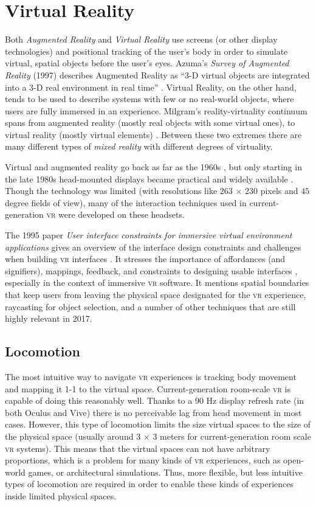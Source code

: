\documentclass{tufte-book} %
\begin{document}
\section{Virtual Reality}
Both \emph{Augmented Reality} and \emph{Virtual Reality} use screens (or other display technologies) and positional tracking of the user's body in order to simulate virtual, spatial objects before the user's eyes. Azuma's \emph{Survey of Augmented Reality} (1997) describes Augmented Reality as ``3-D virtual objects are integrated into a 3-D real environment in real time'' \cite{azuma1997survey}. Virtual Reality, on the other hand, tends to be used to describe systems with few or no real-world objects, where users are fully immersed in an experience.
Milgram's reality-virtuality continuum spans from augmented reality (mostly real objects with some virtual ones), to virtual reality (mostly virtual elements) \cite{milgram1994taxonomy}. Between these two extremes there are many different types of \emph{mixed reality} with different degrees of virtuality.

Virtual and augmented reality go back as far as the 1960s \cite{sutherland1968head}, but only starting in the late 1980s head-mounted displays became practical and widely available \cite{billinghurst2015survey}. Though the technology was limited (with resolutions like $263$ $\times$ $230$ pixels and $45$ degree fields of view), many of the interaction techniques used in current-generation \textsc{vr} were developed on these headsets.

The 1995 paper \emph{User interface constraints for immersive virtual environment applications} gives an overview of the interface design constraints and challenges when building \textsc{vr} interfaces \cite{bowman1995user}. It stresses the importance of affordances (and signifiers), mappings, feedback, and constraints to designing usable interfaces \cite{norman2013design}, especially in the context of immersive \textsc{vr} software. It mentions spatial boundaries that keep users from leaving the physical space designated for the \textsc{vr} experience, raycasting for object selection, and a number of other techniques that are still highly relevant in 2017.

\subsection{Locomotion}
The most intuitive way to navigate \textsc{vr} experiences is tracking body movement and mapping it 1-1 to the virtual space. Current-generation room-scale \textsc{vr} is capable of doing this reasonably well. Thanks to a 90 Hz display refresh rate (in both Oculus and Vive) there is no perceivable lag from head movement in most cases. However, this type of locomotion limits the size virtual spaces to the size of the physical space (usually around $3$ $\times$ $3$ meters for current-generation room scale \textsc{vr} systems). This means that the virtual spaces can not have arbitrary proportions, which is a problem for many kinds of \textsc{vr} experiences, such as open-world games, or architectural simulations. Thus, more flexible, but less intuitive types of locomotion are required in order to enable these kinds of experiences inside limited physical spaces.
\end{document}

